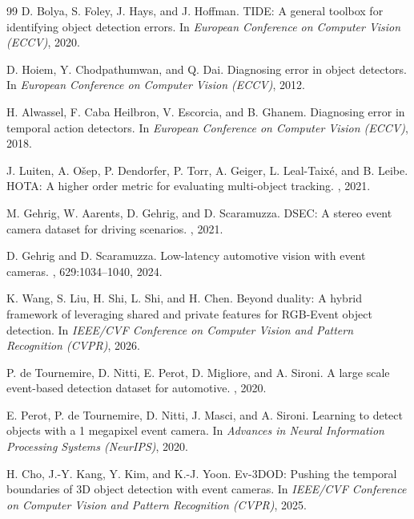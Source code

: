 \documentclass[10pt,twocolumn,letterpaper]{article}
\begin{document}
{\begin{thebibliography}{99}
D. Bolya, S. Foley, J. Hays, and J. Hoffman.
\newblock TIDE: A general toolbox for identifying object detection errors.
\newblock In {\em European Conference on Computer Vision (ECCV)}, 2020.

D. Hoiem, Y. Chodpathumwan, and Q. Dai.
\newblock Diagnosing error in object detectors.
\newblock In {\em European Conference on Computer Vision (ECCV)}, 2012.

H. Alwassel, F. Caba Heilbron, V. Escorcia, and B. Ghanem.
\newblock Diagnosing error in temporal action detectors.
\newblock In {\em European Conference on Computer Vision (ECCV)}, 2018.

J. Luiten, A. O\v{s}ep, P. Dendorfer, P. Torr, A. Geiger, L. Leal-Taix\'e, and
B. Leibe.
\newblock HOTA: A higher order metric for evaluating multi-object tracking.
, 2021.

M. Gehrig, W. Aarents, D. Gehrig, and D. Scaramuzza.
\newblock DSEC: A stereo event camera dataset for driving scenarios.
, 2021.

D. Gehrig and D. Scaramuzza.
\newblock Low-latency automotive vision with event cameras.
, 629:1034--1040, 2024.

K. Wang, S. Liu, H. Shi, L. Shi, and H. Chen.
\newblock Beyond duality: A hybrid framework of leveraging shared and private
features for RGB-Event object detection.
\newblock In {\em IEEE/CVF Conference on Computer Vision and Pattern Recognition
(CVPR)}, 2026.

P. de Tournemire, D. Nitti, E. Perot, D. Migliore, and A. Sironi.
\newblock A large scale event-based detection dataset for automotive.
, 2020.

E. Perot, P. de Tournemire, D. Nitti, J. Masci, and A. Sironi.
\newblock Learning to detect objects with a 1 megapixel event camera.
\newblock In {\em Advances in Neural Information Processing Systems (NeurIPS)},
2020.

H. Cho, J.-Y. Kang, Y. Kim, and K.-J. Yoon.
\newblock Ev-3DOD: Pushing the temporal boundaries of 3D object detection with
event cameras.
\newblock In {\em IEEE/CVF Conference on Computer Vision and Pattern Recognition
(CVPR)}, 2025.


\end{thebibliography}}
\end{document}
